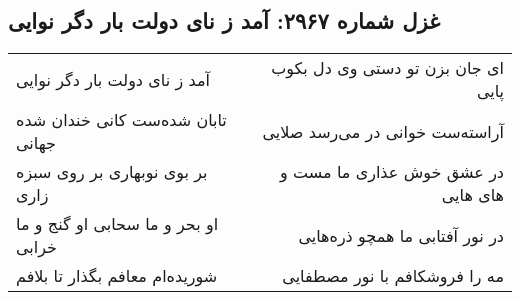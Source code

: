 \begin{center}
\section*{غزل شماره ۲۹۶۷: آمد ز نای دولت بار دگر نوایی}
\label{sec:2967}
\begin{longtable}{l p{0.5cm} r}
آمد ز نای دولت بار دگر نوایی
&&
ای جان بزن تو دستی وی دل بکوب پایی
\\
تابان شده‌ست کانی خندان شده جهانی
&&
آراسته‌ست خوانی در می‌رسد صلایی
\\
بر بوی نوبهاری بر روی سبزه زاری
&&
در عشق خوش عذاری ما مست و های هایی
\\
او بحر و ما سحابی او گنج و ما خرابی
&&
در نور آفتابی ما همچو ذره‌هایی
\\
شوریده‌ام معافم بگذار تا بلافم
&&
مه را فروشکافم با نور مصطفایی
\\
\end{longtable}
\end{center}
